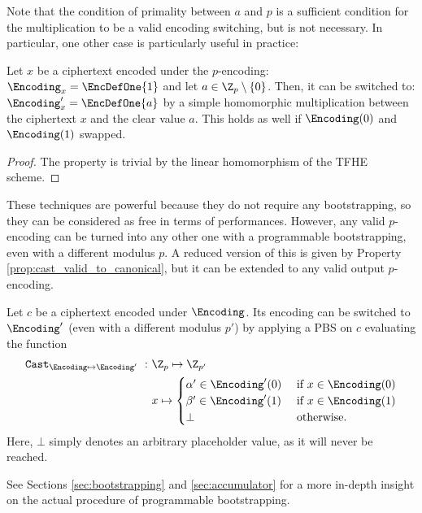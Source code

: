 Note that the condition of primality between $a$ and $p$ is a sufficient condition for the multiplication to be a valid encoding switching, but is not necessary. In particular, one other case is particularly useful in practice:

\begin{property}
\label{prop:mult_from_1}
    Let $x$ be a ciphertext encoded under the $p$-encoding: $\Encoding_x = \EncDefOne{1}$ and let $a \in \Z_p \setminus \{0\}$. Then, it can be switched to: $\Encoding'_x = \EncDefOne{a}$ by a simple homomorphic multiplication between the ciphertext $x$ and the clear value $a$.
    This holds as well if $\Encoding(0)$ and $\Encoding(1)$ swapped.
\end{property}

\begin{proof}
    The property is trivial by the linear homomorphism of the TFHE scheme.
\end{proof} 

These techniques are powerful because they do not require any bootstrapping, so they can be considered as free in terms of performances. However, any valid $p$-encoding can be turned into any other one with a programmable bootstrapping, even with a different modulus $p$. A reduced version of this is given by Property \ref{prop:cast_valid_to_canonical}, but it can be extended to any valid output $p$-encoding.

\begin{property} 
    Let $c$ be a ciphertext encoded under $\Encoding$. Its encoding can be switched to $\Encoding'$ (even with a different modulus $p'$) by applying a PBS on $c$ evaluating the function     \begin{align}
        \texttt{Cast}_{\Encoding \mapsto \Encoding'}~:~& \Z_p \mapsto \Z_{p'}\\
        & x \mapsto \begin{cases}
                        \alpha' \in \Encoding'(0) & \text{ if } x \in \Encoding(0)\\
                        \beta' \in \Encoding'(1) & \text{ if } x \in \Encoding(1)\\
                        \bot & \text{ otherwise.}
                    \end{cases}
    \end{align}
    Here, $\bot$ simply denotes an arbitrary placeholder value, as it will never be reached.
    \label{prop:enc_switch_pbs}
\end{property} 




 See Sections \ref{sec:bootstrapping} and \ref{sec:accumulator} for a more in-depth insight on the actual procedure of programmable bootstrapping.
